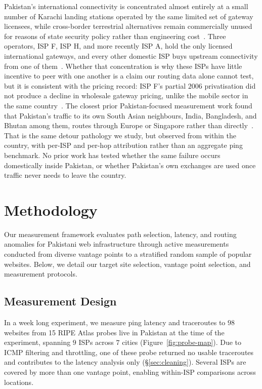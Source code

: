 \documentclass[sigconf,anonymous,10pt]{acmart}
\begin{document}
Pakistan's international connectivity is concentrated almost entirely at a small number of Karachi landing stations operated by the same limited set of gateway licensees, while cross-border terrestrial alternatives remain commercially unused for reasons of state security policy rather than engineering cost~\cite{opalinski2024quest}. Three operators, ISP F, ISP H, and more recently ISP A, hold the only licensed international gateways, and every other domestic ISP buys upstream connectivity from one of them~\cite{pacra2026telecom}. Whether that concentration is why these ISPs have little incentive to peer with one another is a claim our routing data alone cannot test, but it is consistent with the pricing record: ISP F's partial $2006$ privatisation did not produce a decline in wholesale gateway pricing, unlike the mobile sector in the same country~\cite{gonzalez2026peering}. The closest prior Pakistan-focused measurement work found that Pakistan's traffic to its own South Asian neighbours, India, Bangladesh, and Bhutan among them, routes through Europe or Singapore rather than directly~\cite{ali2017internet}. That is the same detour pathology we study, but observed from within the country, with per-ISP and per-hop attribution rather than an aggregate ping benchmark. No prior work has tested whether the same failure occurs domestically inside Pakistan, or whether Pakistan's own exchanges are used once traffic never needs to leave the country.

\section{Methodology}
\label{sec:methodology}
Our measurement framework evaluates path selection, latency, and routing anomalies for Pakistani web infrastructure through active measurements conducted from diverse vantage points to a stratified random sample of popular websites. 
Below, we detail our target site selection, vantage point selection, and measurement protocols.

\subsection{Measurement Design}
\label{sec:measurement}
In a week long experiment, we measure ping latency and traceroutes to $98$ websites from 15 RIPE Atlas probes live in Pakistan at the time of the experiment, spanning $9$ ISPs across $7$ cities (Figure~\ref{fig:probe-map}). Due to ICMP filtering and throttling, one of these probe returned no usable traceroutes and contributes to the latency analysis only (\S\ref{sec:cleaning}). Several ISPs are covered by more than one vantage point, enabling within-ISP comparisons across locations.
\end{document}
